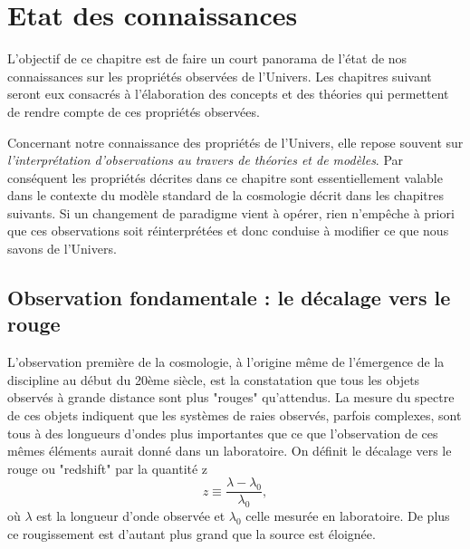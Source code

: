 \chapter{Etat des connaissances}


L'objectif de ce chapitre est de faire un court panorama de l'état de nos connaissances sur les propriétés observées de l'Univers. Les chapitres suivant seront eux consacrés à l'élaboration des concepts et des théories qui permettent de rendre compte de ces propriétés observées. 

Concernant notre connaissance des propriétés de l'Univers, elle repose souvent sur \textit{l'interprétation d'observations au travers de théories et de modèles}. Par conséquent les propriétés décrites dans ce chapitre sont essentiellement valable dans le contexte du modèle standard de la cosmologie décrit dans les chapitres suivants. Si un changement de paradigme vient à opérer, rien n'empêche à priori que ces observations soit réinterprétées et donc conduise à modifier ce que nous savons de l'Univers.

\section{Observation fondamentale : le décalage vers le rouge}
L'observation première de la cosmologie, à l'origine même de l'émergence de la discipline au début du 20ème siècle, est la constatation que tous les objets observés à grande distance sont plus "rouges" qu'attendus. La mesure du spectre de ces objets indiquent que les systèmes de raies observés, parfois complexes, sont tous à des longueurs d'ondes plus importantes que ce que l'observation de ces mêmes éléments aurait donné dans un laboratoire. On définit le décalage vers le rouge ou "redshift" par la quantité z
\begin{equation}
z\equiv\frac{\lambda-\lambda_0}{\lambda_0},
\end{equation}
où $\lambda$ est la longueur d'onde observée et $\lambda_0$ celle mesurée en laboratoire. De plus ce rougissement est d'autant plus grand que la source est éloignée. 

